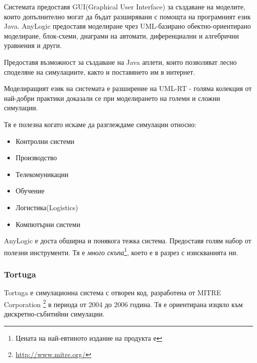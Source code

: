 				Системата предоставя GUI(Graphical User Interface) за създаване на моделите, 
				които допълнително могат да бъдат разширявани с помощта на програмният език Java. 			
				AnyLogic предоставя моделиране чрез UML-базирано обектно-ориентирано моделиране, блок-схеми, 
				диаграми на автомати, диференциални и алгебрични уравнения и други.


				Предоставя възможност за създаване на Java аплети, които позволяват 
				лесно споделяне на симулациите, както и поставянето им в интернет.
		
		
				Моделиращият език на системата е разширение на UML-RT - голяма колекция от най-добри практики
				доказали се при моделирането на големи и сложни симулации.
		
							
				Тя е полезна когато искаме да разглеждаме симулации относно:
				
				\begin{itemize}
					\item Контролни системи
					\item Производство
					\item Телекомуникации
					\item Обучение
					\item Логистика(Logistics)
					\item Компютърни системи
				\end{itemize}			
				
				
				AnyLogic е доста обширна и понякога тежка система. Предоставя голям набор от полезни инструменти.
				Тя е \emph{много скъпа}\footnote{Цената на най-евтиното издание на продукта е }, 
				което е в разрез с изискванията ни. \cite{AnyLogic}
			
		\subsubsection{Tortuga}
		
			Tortuga е симулационна система с отворен код, разработена от MITRE Corporation
			\footnote{\url{http://www.mitre.org/}} в периода от 2004 до 2006 година.
			Тя е ориентирана изцяло към дискретно-събитийни симулации.
			
			

